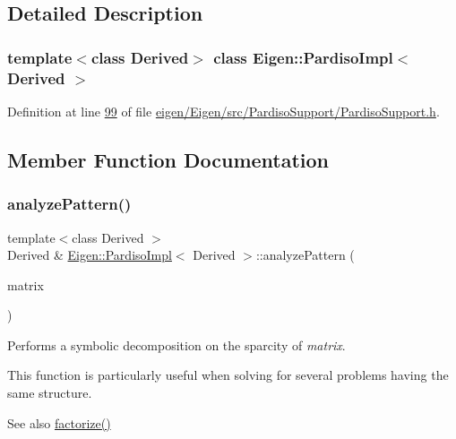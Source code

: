 \subsection{Detailed Description}
\subsubsection*{template$<$class Derived$>$\newline
class Eigen\+::\+Pardiso\+Impl$<$ Derived $>$}



Definition at line \hyperlink{eigen_2_eigen_2src_2_pardiso_support_2_pardiso_support_8h_source_l00099}{99} of file \hyperlink{eigen_2_eigen_2src_2_pardiso_support_2_pardiso_support_8h_source}{eigen/\+Eigen/src/\+Pardiso\+Support/\+Pardiso\+Support.\+h}.



\subsection{Member Function Documentation}
\mbox{\label{class_eigen_1_1_pardiso_impl_af1773ce06014b55a69cd42daf34eeec4}} 
\subsubsection{\texorpdfstring{analyze\+Pattern()}{analyzePattern()}\hspace{0.1cm}{\footnotesize\ttfamily [1/2]}}
{\footnotesize\ttfamily template$<$class Derived $>$ \\
Derived \& \hyperlink{class_eigen_1_1_pardiso_impl}{Eigen\+::\+Pardiso\+Impl}$<$ Derived $>$\+::analyze\+Pattern (\begin{DoxyParamCaption}\item[{const Matrix\+Type \&}]{matrix }\end{DoxyParamCaption})}

Performs a symbolic decomposition on the sparcity of {\itshape matrix}.

This function is particularly useful when solving for several problems having the same structure.

\begin{DoxySeeAlso}{See also}
\hyperlink{class_eigen_1_1_pardiso_impl_a6a4c092c5fb581a946d3c4e5ec347dfb}{factorize()} 
\end{DoxySeeAlso}


